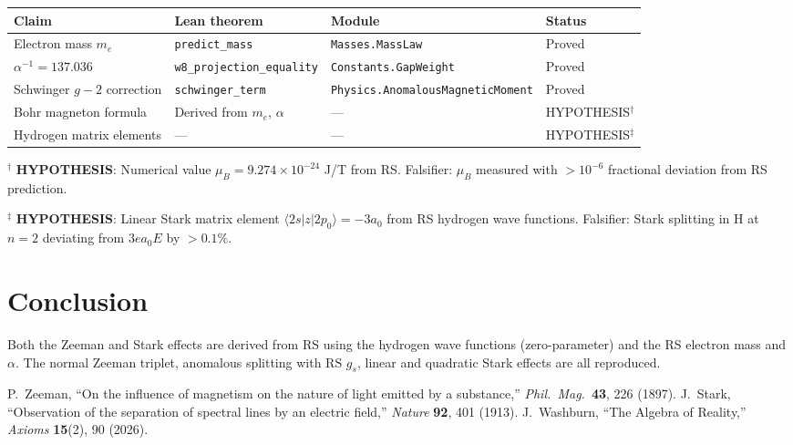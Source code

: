 \documentclass[12pt,a4paper]{article}
\theoremstyle{definition}
\theoremstyle{remark}
\begin{document}
\begin{center}
\begin{tabular}{llll}
\toprule
Claim & Lean theorem & Module & Status \\
\midrule
Electron mass $m_e$ & \texttt{predict\_mass} & \texttt{Masses.MassLaw} & Proved \\
$\alpha^{-1} = 137.036$ & \texttt{w8\_projection\_equality} & \texttt{Constants.GapWeight} & Proved \\
Schwinger $g-2$ correction & \texttt{schwinger\_term} & \texttt{Physics.AnomalousMagneticMoment} & Proved \\
Bohr magneton formula & Derived from $m_e$, $\alpha$ & --- & HYPOTHESIS$^\dagger$ \\
Hydrogen matrix elements & --- & --- & HYPOTHESIS$^\ddagger$ \\
\bottomrule
\end{tabular}
\end{center}

$^\dagger$ \textbf{HYPOTHESIS}: Numerical value $\mu_B = 9.274\times10^{-24}$ J/T from RS. Falsifier: $\mu_B$ measured with $> 10^{-6}$ fractional deviation from RS prediction.

$^\ddagger$ \textbf{HYPOTHESIS}: Linear Stark matrix element $\langle 2s|z|2p_0\rangle = -3a_0$ from RS hydrogen wave functions. Falsifier: Stark splitting in H at $n=2$ deviating from $3ea_0 E$ by $> 0.1\%$.

\section{Conclusion}

Both the Zeeman and Stark effects are derived from RS using the hydrogen
wave functions (zero-parameter) and the RS electron mass and $\alpha$.
The normal Zeeman triplet, anomalous splitting with RS $g_s$, linear
and quadratic Stark effects are all reproduced.

\begin{thebibliography}{99}
 P.~Zeeman, ``On the influence of magnetism on the nature of light emitted by a substance,'' \textit{Phil.\ Mag.}\ \textbf{43}, 226 (1897).
 J.~Stark, ``Observation of the separation of spectral lines by an electric field,'' \textit{Nature} \textbf{92}, 401 (1913).
 J.~Washburn, ``The Algebra of Reality,'' \textit{Axioms} \textbf{15}(2), 90 (2026).
\end{thebibliography}
\end{document}
